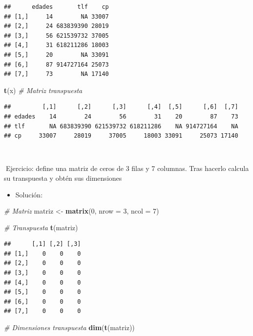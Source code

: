 \documentclass[11pt,]{book}
\newenvironment{Shaded}{\begin{snugshade}}{\end{snugshade}}
\newcommand{\CommentTok}[1]{\textcolor[rgb]{0.37,0.37,0.37}{\textit{#1}}}
\newcommand{\DataTypeTok}[1]{\textcolor[rgb]{0.27,0.27,0.27}{#1}}
\newcommand{\DecValTok}[1]{\textcolor[rgb]{0.06,0.06,0.06}{#1}}
\newcommand{\KeywordTok}[1]{\textcolor[rgb]{0.27,0.27,0.27}{\textbf{#1}}}
\newcommand{\NormalTok}[1]{#1}
\newcommand{\StringTok}[1]{\textcolor[rgb]{0.5,0.5,0.5}{#1}}
\providecommand{\tightlist}{%
  \setlength{\itemsep}{0pt}\setlength{\parskip}{0pt}}
\begin{document}
\begin{verbatim}
##      edades       tlf    cp
## [1,]     14        NA 33007
## [2,]     24 683839390 28019
## [3,]     56 621539732 37005
## [4,]     31 618211286 18003
## [5,]     20        NA 33091
## [6,]     87 914727164 25073
## [7,]     73        NA 17140
\end{verbatim}

\begin{Shaded}
\begin{Highlighting}[]
\KeywordTok{t}\NormalTok{(x) }\CommentTok{# Matriz transpuesta}
\end{Highlighting}
\end{Shaded}

\begin{verbatim}
##         [,1]      [,2]      [,3]      [,4]  [,5]      [,6]  [,7]
## edades    14        24        56        31    20        87    73
## tlf       NA 683839390 621539732 618211286    NA 914727164    NA
## cp     33007     28019     37005     18003 33091     25073 17140
\end{verbatim}

~

📝Ejercicio: define una matriz de ceros de 3 filas y 7 columnas. Tras hacerlo calcula su transpuesta y obtén sus dimensiones

\begin{itemize}
\tightlist
\item
  Solución:
\end{itemize}

\begin{Shaded}
\begin{Highlighting}[]
\CommentTok{# Matriz}
\NormalTok{matriz <-}\StringTok{ }\KeywordTok{matrix}\NormalTok{(}\DecValTok{0}\NormalTok{, }\DataTypeTok{nrow =} \DecValTok{3}\NormalTok{, }\DataTypeTok{ncol =} \DecValTok{7}\NormalTok{)}

\CommentTok{# Transpuesta}
\KeywordTok{t}\NormalTok{(matriz)}
\end{Highlighting}
\end{Shaded}

\begin{verbatim}
##      [,1] [,2] [,3]
## [1,]    0    0    0
## [2,]    0    0    0
## [3,]    0    0    0
## [4,]    0    0    0
## [5,]    0    0    0
## [6,]    0    0    0
## [7,]    0    0    0
\end{verbatim}

\begin{Shaded}
\begin{Highlighting}[]
\CommentTok{# Dimensiones transpuesta}
\KeywordTok{dim}\NormalTok{(}\KeywordTok{t}\NormalTok{(matriz))}
\end{Highlighting}
\end{Shaded}
\end{document}
